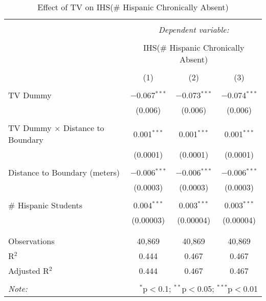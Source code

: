 
\begin{table}[!htbp] \centering 
  \caption{Effect of TV on IHS(\# Hispanic Chronically Absent)} 
  \label{} 
\begin{tabular}{@{\extracolsep{-2pt}}lccc} 
\\[-1.8ex]\hline 
\hline \\[-1.8ex] 
 & \multicolumn{3}{c}{\textit{Dependent variable:}} \\ 
\cline{2-4} 
\\[-1.8ex] & \multicolumn{3}{c}{IHS(\# Hispanic Chronically Absent)} \\ 
\\[-1.8ex] & (1) & (2) & (3)\\ 
\hline \\[-1.8ex] 
 TV Dummy & $-$0.067$^{***}$ & $-$0.073$^{***}$ & $-$0.074$^{***}$ \\ 
  & (0.006) & (0.006) & (0.006) \\ 
  & & & \\ 
 TV Dummy $\times$ Distance to Boundary & 0.001$^{***}$ & 0.001$^{***}$ & 0.001$^{***}$ \\ 
  & (0.0001) & (0.0001) & (0.0001) \\ 
  & & & \\ 
 Distance to Boundary (meters) & $-$0.006$^{***}$ & $-$0.006$^{***}$ & $-$0.006$^{***}$ \\ 
  & (0.0003) & (0.0003) & (0.0003) \\ 
  & & & \\ 
 \# Hispanic Students & 0.004$^{***}$ & 0.003$^{***}$ & 0.003$^{***}$ \\ 
  & (0.00003) & (0.00004) & (0.00004) \\ 
  & & & \\ 
\hline \\[-1.8ex] 
Observations & 40,869 & 40,869 & 40,869 \\ 
R$^{2}$ & 0.444 & 0.467 & 0.467 \\ 
Adjusted R$^{2}$ & 0.444 & 0.467 & 0.467 \\ 
\hline 
\hline \\[-1.8ex] 
\textit{Note:}  & \multicolumn{3}{r}{$^{*}$p$<$0.1; $^{**}$p$<$0.05; $^{***}$p$<$0.01} \\ 
\end{tabular} 
\end{table} 
